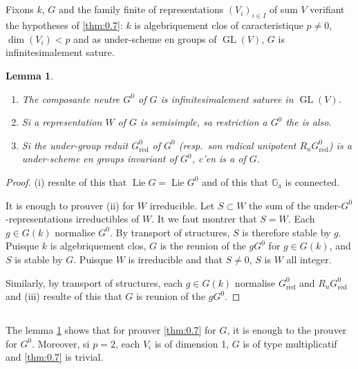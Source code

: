 \documentclass[11pt,a4paper]{article}
\theoremstyle{plain}
\newtheorem{lemma}[theorem]{Lemma}
\theoremstyle{definition}
\DeclareMathOperator{\Lie}{Lie}
\DeclareMathOperator{\GL}{GL}
\newcommand{\Ga}{\mathbb{G}_\mathrm{a}}
\newcommand{\red}{\mathrm{r\acute{e}d}}
\begin{document}
\subsection{}
Fixons $k$, $G$ and the family finite of representations $(V_i)_{i \in I}$ of sum $V$ verifiant the hypotheses of \ref{thm:0.7}: $k$ is algebriquement clos of caracteristique $p \neq 0$, $\dim(V_i) < p$ and as under-scheme en groups of $\GL(V)$, $G$ is infinitesimalement sature.

\begin{lemma}\label{lem:1.3}
\begin{enumerate}[label=(\roman*)]
\item The composante neutre $G^0$ of $G$ is infinitesimalement saturee in $\GL(V)$.
\item Si a representation $W$ of $G$ is semisimple, sa restriction a $G^0$ the is also.
\item Si the under-group reduit $G^0_\red$ of $G^0$ (resp.\ son radical unipotent $R_u G^0_\red$) is a under-scheme en groups invariant of $G^0$, c'en is a of $G$.
\end{enumerate}
\end{lemma}

\begin{proof}
(i) resulte of this that $\Lie G = \Lie G^0$ and of this that $\Ga$ is connected.

It is enough to prouver (ii) for $W$ irreducible. Let $S \subset W$ the sum of the under-$G^0$-repre\-sen\-ta\-tions irreductibles of $W$. It we faut montrer that $S = W$. Each $g \in G(k)$ normalise $G^0$. By transport of structures, $S$ is therefore stable by $g$. Puisque $k$ is algebriquement clos, $G$ is the reunion of the $gG^0$ for $g \in G(k)$, and $S$ is stable by $G$. Puisque $W$ is irreducible and that $S \neq 0$, $S$ is $W$ all integer.

Similarly, by transport of structures, each $g \in G(k)$ normalise $G^0_\red$ and $R_u G^0_\red$ and (iii) resulte of this that $G$ is reunion of the $gG^0$.
\end{proof}

\subsection{}
The lemma \ref{lem:1.3} shows that for prouver \ref{thm:0.7} for $G$, it is enough to the prouver for $G^0$. Moreover, si $p = 2$, each $V_i$ is of dimension 1, $G$ is of type multiplicatif and \ref{thm:0.7} is trivial.
\end{document}
